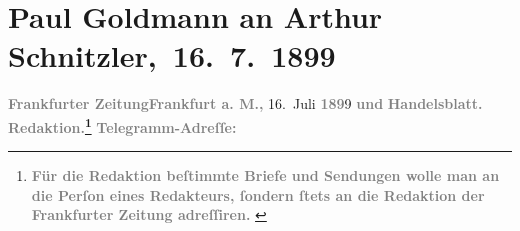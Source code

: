 

         
         \renewcommand{\erwaehntePersonen}{Personen: Richard Beer-Hofmann, Paul Goldmann, Hermann Hettner, Fedor Mamroth}
         \renewcommand{\erwaehnteInstitutionen}{Institutionen: Frankfurter Zeitung, Friedrich Vieweg und Sohn}
         \renewcommand{\erwaehnteOrte}{Orte: Bayreuth, Braunschweig, Florenz, Frankfurt am Main, Italien, Rennes, Rom, Slawonien, Velden am Wörthersee, Wien}
         \renewcommand{\erwaehnteWerke}{Werke: Ein Sommer in China. Reisebilder, Geschichte der französischen Literatur im achtzehnten Jahrhundert}
               \section[ Paul Goldmann an Arthur Schnitzler, 16. 7. 1899]{ Paul Goldmann an Arthur Schnitzler, 16. 7. 1899}\nopagebreak{}\rehead{ }\begin{ledgroupsized}[t]{13cm}\normalsize\beginnumbering{} \toendnotes[C]{\smallbreak\pagebreak[2]} 
\toendnotes[C]{\smallbreak}\pstart
           \noindent{}{\pb}\textcolor{gray}{\textbf{\textbf{Frankfurter Zeitung}}}\hfill \textcolor{gray}{\textbf{\textbf{Frankfurt a. M.,}}}{ }16. Juli \textcolor{gray}{\textbf{189}}9\pend
           \pstart
           \textcolor{gray}{\textbf{und}}\pend
           \pstart
           \textcolor{gray}{\textbf{Handelsblatt.}}\pend
           \pstart
           \textcolor{gray}{\textbf{\textbf{Redaktion.}\footnote{\noindent{}\textcolor{gray}{\textbf{Für die Redaktion beſtimmte Briefe und Sendungen wolle man
                                  an die Perſon eines Redakteurs,
                              ſondern ſtets \textbf{an die Redaktion der Frankfurter Zeitung} adreſſiren. }}}}}\pend
           \pstart
           \textcolor{gray}{\textbf{Telegramm-Adreſſe:}}\pend

\end{ledgroupsized}
